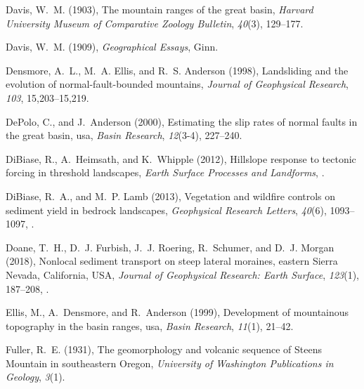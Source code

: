 \begin{thebibliography}{41}
Davis, W.~M. (1903), The mountain ranges of the great basin, \textit{Harvard
  University Museum of Comparative Zoology Bulletin}, \textit{40}(3), 129--177.

Davis, W.~M. (1909), \textit{Geographical Essays}, Ginn.

Densmore, A.~L., M.~A. Ellis, and R.~S. Anderson (1998), Landsliding and the
  evolution of normal-fault-bounded mountains, \textit{Journal of Geophysical
  Research}, \textit{103}, 15,203--15,219.

DePolo, C., and J.~Anderson (2000), Estimating the slip rates of normal faults
  in the great basin, usa, \textit{Basin Research}, \textit{12}(3-4), 227--240.

DiBiase, R., A.~Heimsath, and K.~Whipple (2012), Hillslope response to tectonic
  forcing in threshold landscapes, \textit{Earth Surface Processes and
  Landforms}, .

DiBiase, R.~A., and M.~P. Lamb (2013), Vegetation and wildfire controls on
  sediment yield in bedrock landscapes, \textit{Geophysical Research Letters},
  \textit{40}(6), 1093--1097, .

Doane, T.~H., D.~J. Furbish, J.~J. Roering, R.~Schumer, and D.~J. Morgan
  (2018), {Nonlocal sediment transport on steep lateral moraines, eastern
  Sierra Nevada, California, USA}, \textit{Journal of Geophysical Research:
  Earth Surface}, \textit{123}(1), 187--208, .

Ellis, M., A.~Densmore, and R.~Anderson (1999), Development of mountainous
  topography in the basin ranges, usa, \textit{Basin Research}, \textit{11}(1),
  21--42.

Fuller, R.~E. (1931), {The geomorphology and volcanic sequence of Steens
  Mountain in southeastern Oregon}, \textit{University of Washington
  Publications in Geology}, \textit{3}(1).


\end{thebibliography}
